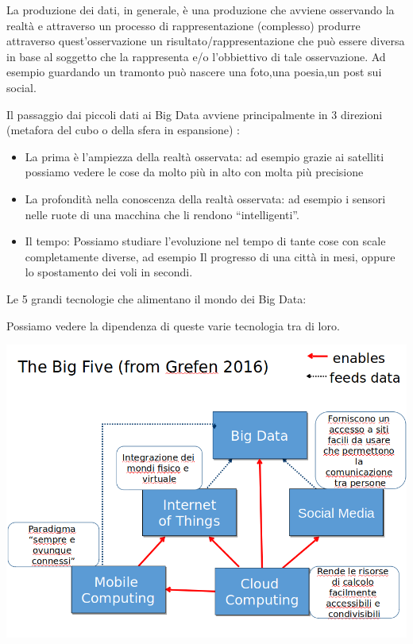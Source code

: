 \documentclass[a4page, 11pt]{article}
\begin{document}
La produzione dei dati, in generale, è una produzione che avviene
osservando la realtà e attraverso un processo di rappresentazione
(complesso) produrre attraverso quest'osservazione un
risultato/rappresentazione che può essere diversa in base al soggetto
che la rappresenta e/o l'obbiettivo di tale osservazione.
Ad esempio guardando un tramonto può nascere una foto,una poesia,un post sui social.

Il passaggio dai piccoli dati ai Big Data avviene principalmente in 3
direzioni (metafora del cubo o della sfera in espansione) :

\begin{itemize}
	 
	\item
	La prima è l'ampiezza della realtà osservata: ad esempio grazie ai
	satelliti possiamo vedere le cose da molto più in alto con molta più
	precisione
	\item
	La profondità nella conoscenza della realtà osservata: ad esempio i
	sensori nelle ruote di una macchina che li rendono ``intelligenti''.
	\item
	Il tempo: Possiamo studiare l'evoluzione nel tempo di tante cose con
	scale completamente diverse, ad esempio Il progresso di una città in
	mesi, oppure lo spostamento dei voli in secondi.
\end{itemize}

Le 5 grandi tecnologie che alimentano il mondo dei Big Data:

Possiamo vedere la dipendenza di queste varie tecnologia tra di loro.
\begin{center}
	\includegraphics[scale=0.4]{image7.png}
\end{center}
\end{document}
